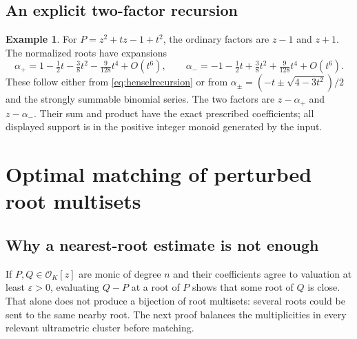 \documentclass[11pt,letterpaper]{article}
\numberwithin{equation}{section}
\theoremstyle{definition}
\newtheorem{example}[theorem]{Example}
\theoremstyle{remark}\newtheorem{remark}[theorem]{Remark}
\newcommand{\OO}{\mathcal O}
\begin{document}
\subsection{An explicit two-factor recursion}
\begin{example}\label{ex:hensel}
For $P=z^2+tz-1+t^2$, the ordinary factors are $z-1$ and $z+1$.
The normalized roots have expansions
\[
 \alpha_+=1-\tfrac12t-\tfrac38t^2-\tfrac9{128}t^4+O(t^6),\qquad
 \alpha_-=-1-\tfrac12t+\tfrac38t^2+\tfrac9{128}t^4+O(t^6).
\]
These follow either from \eqref{eq:henselrecursion} or from
$\alpha_\pm=(-t\pm\sqrt{4-3t^2})/2$ and the strongly summable binomial
series. The two factors are $z-\alpha_+$ and $z-\alpha_-$. Their sum
and product have the exact prescribed coefficients; all displayed
support is in the positive integer monoid generated by the input.
\end{example}

\section{Optimal matching of perturbed root multisets}\label{sec:holder}

\subsection{Why a nearest-root estimate is not enough}
If $P,Q\in\OO_K[z]$ are monic of degree $n$ and their coefficients
agree to valuation at least $\varepsilon>0$, evaluating $Q-P$ at a
root of $P$ shows that some root of $Q$ is close. That alone does
not produce a bijection of root multisets: several roots could be
sent to the same nearby root. The next proof balances the multiplicities
in every relevant ultrametric cluster before matching.
\end{document}
